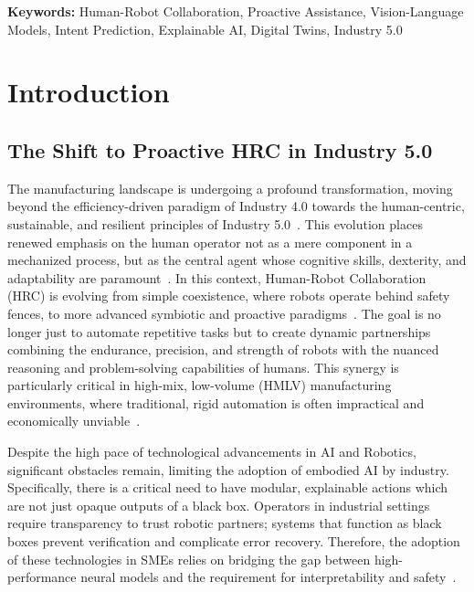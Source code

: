 \documentclass[11pt, a4paper]{article}
\begin{document}
\textbf{Keywords:} Human-Robot Collaboration, Proactive Assistance, Vision-Language Models, Intent Prediction, Explainable AI, Digital Twins, Industry 5.0

\section{Introduction}

\subsection{The Shift to Proactive HRC in Industry 5.0}

The manufacturing landscape is undergoing a profound transformation, moving beyond the efficiency-driven paradigm of Industry 4.0 towards the human-centric, sustainable, and resilient principles of Industry 5.0~\cite{Andronas2021}. This evolution places renewed emphasis on the human operator not as a mere component in a mechanized process, but as the central agent whose cognitive skills, dexterity, and adaptability are paramount~\cite{Polini2020}. In this context, Human-Robot Collaboration (HRC) is evolving from simple coexistence, where robots operate behind safety fences, to more advanced symbiotic and proactive paradigms~\cite{Andronas2021, Asad2023}. The goal is no longer just to automate repetitive tasks but to create dynamic partnerships combining the endurance, precision, and strength of robots with the nuanced reasoning and problem-solving capabilities of humans. This synergy is particularly critical in high-mix, low-volume (HMLV) manufacturing environments, where traditional, rigid automation is often impractical and economically unviable~\cite{Polini2020, David2023}.


Despite the high pace of technological advancements in AI and Robotics, significant obstacles remain, limiting the adoption of embodied AI by industry. Specifically, there is a critical need to have modular, explainable actions which are not just opaque outputs of a black box. Operators in industrial settings require transparency to trust robotic partners; systems that function as black boxes prevent verification and complicate error recovery. Therefore, the adoption of these technologies in SMEs relies on bridging the gap between high-performance neural models and the requirement for interpretability and safety~\cite{Adadi2018, Gunning2019}.
\end{document}
